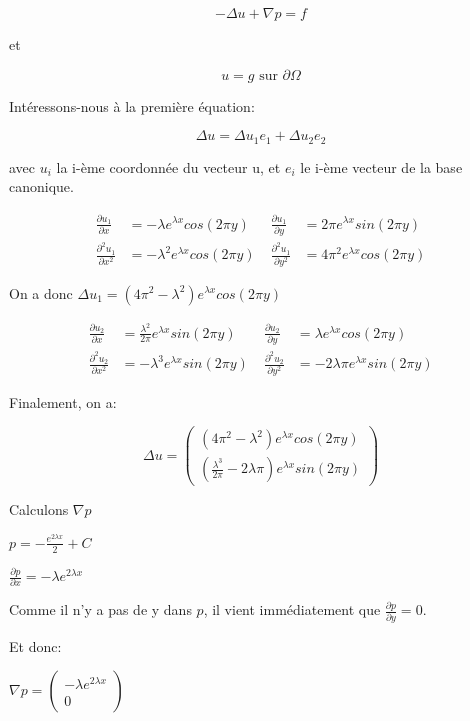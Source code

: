 \documentclass{article}
\begin{document}
$$- \Delta u + \nabla p = f$$

et 

$$u=g \text{ sur } \partial \Omega$$

Intéressons-nous à la première équation:

$$\Delta u = \Delta u_1 e_1+ \Delta u_2 e_2$$

avec $u_i$ la i-ème coordonnée du vecteur u, et $e_i$ le i-ème vecteur de la base canonique.

\begin{align*}
    \frac{\partial u_1}{\partial x} &= -\lambda e^{\lambda x} cos(2 \pi y)& \; \frac{\partial u_1}{\partial y} &= 2 \pi e^{\lambda x} sin(2 \pi y) \\
    \frac{\partial^2 u_1}{\partial x^2} &= - \lambda^2 e^{\lambda x} cos(2 \pi y)& \; \frac{\partial^2 u_1}{\partial y^2} &= 4 \pi^2 e^{\lambda x} cos(2 \pi y)
\end{align*}

On a donc $\Delta u_1 = (4 \pi^2-\lambda^2) e^{\lambda x} cos(2 \pi y)$

\begin{align*}
    \frac{\partial u_2}{\partial x} &= \frac{\lambda^2}{2 \pi} e^{\lambda x} sin(2 \pi y)& \; \frac{\partial u_2}{\partial y} &= \lambda e^{\lambda x} cos(2 \pi y) \\
    \frac{\partial^2 u_2}{\partial x^2} &= - \lambda^3 e^{\lambda x} sin(2 \pi y)& \; \frac{\partial^2 u_2}{\partial y^2} &= - 2 \lambda \pi e^{\lambda x} sin(2 \pi y)
\end{align*}

Finalement, on a:

$$\Delta u = \begin{pmatrix}
(4 \pi^2-\lambda^2) e^{\lambda x} cos(2 \pi y) \\
(\frac{\lambda^3}{2 \pi}-2 \lambda \pi) e^{\lambda x} sin(2 \pi y)
\end{pmatrix}$$

Calculons $\nabla p$

$p = -\frac{e^{2 \lambda x}}{2} + C$

$\frac{\partial p}{\partial x} = -\lambda e^{2 \lambda x}$

Comme il n'y a pas de y dans $p$, il vient immédiatement que $\frac{\partial p}{\partial y} = 0$.

Et donc:

$\nabla p = \begin{pmatrix}
    -\lambda e^{2 \lambda x} \\
    0
\end{pmatrix}$
\end{document}
